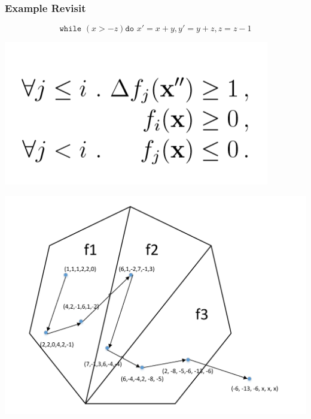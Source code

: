 \documentclass[11pt]{beamer}
\begin{document}
\begin{frame}\frametitle{Example Revisit}
\[\texttt{while }( x > -z) \texttt{do } x' = x + y, y' = y + z, z = z - 1\]

\begin{center}
\includegraphics[scale = 0.2]{3.png}

\includegraphics[scale = 0.4]{3.pdf}
\end{center}
\end{frame}
\end{document}
